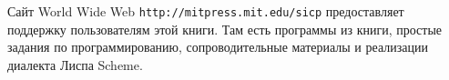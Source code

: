 Сайт World Wide Web {\texttt {http://mitpress.mit.edu/sicp}}
предоставляет поддержку
пользователям этой книги.  Там есть программы из книги, простые
задания по программированию, сопроводительные материалы и реализации
диалекта Лиспа Scheme.
{\sloppy

}

